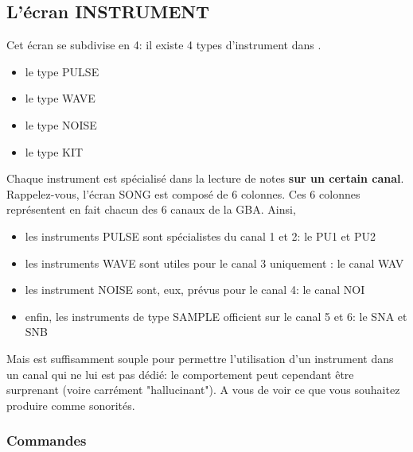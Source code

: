 \documentclass[12pt,a4paper]{article}
\begin{document}
    \subsection{L'écran INSTRUMENT}
    
    Cet écran se subdivise en 4: il existe 4 types d'instrument dans \FAT.\medskip
    
    \begin{itemize}
        \item{le type PULSE}
        \item{le type WAVE}
        \item{le type NOISE}
        \item{le type KIT}
    \end{itemize}\medskip
    
     Chaque instrument est spécialisé dans la lecture de notes {\bf sur un certain canal}. Rappelez-vous, l'écran SONG est composé de 6 colonnes. Ces 6 colonnes représentent en fait chacun des 6 canaux de la GBA. Ainsi,
     
     \begin{itemize}
        \item{les instruments PULSE sont spécialistes du canal 1 et 2: le PU1 et PU2}
        \item{les instruments WAVE sont utiles pour le canal 3 uniquement : le canal WAV}
        \item{les instrument NOISE sont, eux, prévus pour le canal 4: le canal NOI}
        \item{enfin, les instruments de type SAMPLE officient sur le canal 5 et 6: le SNA et SNB}
     \end{itemize}\medskip
     
     Mais \FAT est suffisamment souple pour permettre l'utilisation d'un instrument dans un canal qui ne lui est pas dédié: le comportement peut cependant être surprenant (voire carrément "hallucinant"). A vous de voir ce que vous souhaitez produire comme sonorités.

        \subsubsection{Commandes}
        
\end{document}
